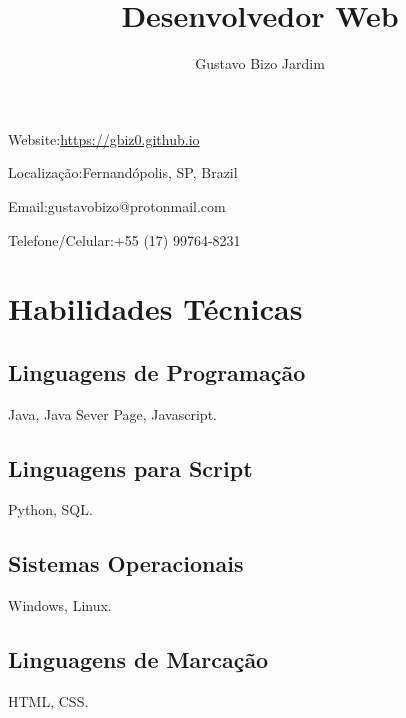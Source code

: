\documentclass[16pt]{article}
\makeatletter
\renewcommand{\maketitle}
{
  \begin{center}
    \Huge\bfseries
    \textsf{\textbf{\thetitle}}

    \setstretch{1.25}
    \Large
    \textsf{\theauthor}
  \end{center}
  \normalsize
  \begin{minipage}[t]{0.5\linewidth}
    Website:\hspace{0.2em}\url{https://gbiz0.github.io}

    Localização:\hspace{0.2em}Fernand\'opolis, SP, Brazil
  \end{minipage}
  \hfill
  \begin{minipage}[t]{0.5\linewidth}
    \hfill
    Email:\hspace{0.2em}gustavobizo@protonmail.com

    \hfill
    Telefone/Celular:\hspace{0.2em}+55 (17) 99764-8231
  \end{minipage}
}
\makeatother
\begin{document}
  \thispagestyle{empty}
  \title{Desenvolvedor Web}
  \author{Gustavo Bizo Jardim}
  \maketitle
  \section{Habilidades Técnicas}
    \begin{minipage}[t]{0.47\linewidth}
      \subsection{Linguagens de Programação}
        Java, Java Sever Page, Javascript.\\
      \subsection{Linguagens para Script}
        Python, SQL.
      \subsection{Sistemas Operacionais}
        Windows, Linux.\\
    \end{minipage}
    \hfill\vline\hfill
    \begin{minipage}[t]{0.5\linewidth}
      \subsection{Linguagens de Marcação}
        HTML, CSS.\\
    \end{minipage}
\end{document}
